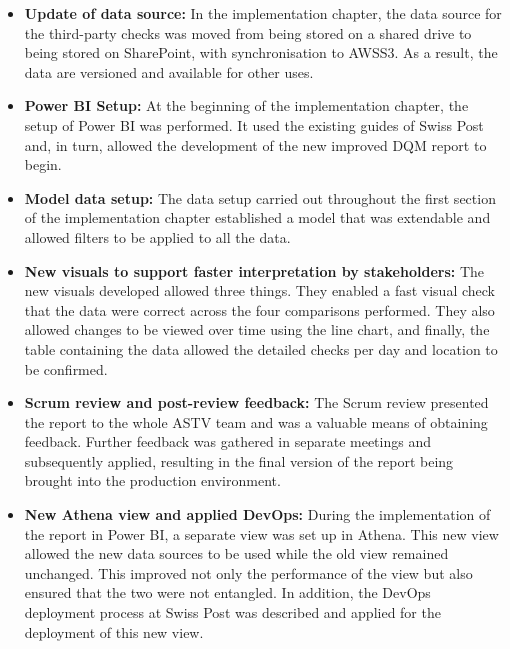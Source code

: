 \begin{itemize}
    
\item \textbf{Update of data source:} In the implementation chapter, the data source for the third-party checks was moved from being stored on a shared drive to being stored on SharePoint, with synchronisation to \gls{AWSS3}. As a result, the data are versioned and available for other uses.

\item \textbf{Power BI Setup:} At the beginning of the implementation chapter, the setup of Power BI was performed. It used the existing guides of Swiss Post and, in turn, allowed the development of the new improved \gls{DQM} report to begin.

\item \textbf{Model data setup:} The data setup carried out throughout the first section of the implementation chapter established a model that was extendable and allowed filters to be applied to all the data.

\item \textbf{New visuals to support faster interpretation by stakeholders:} The new visuals developed allowed three things. They enabled a fast visual check that the data were correct across the four comparisons performed. They also allowed changes to be viewed over time using the line chart, and finally, the table containing the data allowed the detailed checks per day and location to be confirmed.

\item \textbf{Scrum review and post-review feedback:} The Scrum review presented the report to the whole \gls{ASTV} team and was a valuable means of obtaining feedback. Further feedback was gathered in separate meetings and subsequently applied, resulting in the final version of the report being brought into the production environment.

\item \textbf{New Athena view and applied DevOps:} During the implementation of the report in Power BI, a separate view was set up in Athena. This new view allowed the new data sources to be used while the old view remained unchanged. This improved not only the performance of the view but also ensured that the two were not entangled. In addition, the DevOps deployment process at Swiss Post was described and applied for the deployment of this new view.
\end{itemize}



